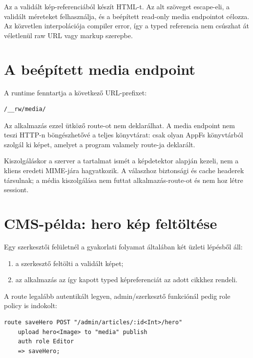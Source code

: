 Az  a validált kép-referenciából készít HTML-t. Az alt szöveget escape-eli, a validált méreteket felhasználja, és a beépített read-only media endpointot célozza. Az  közvetlen  interpolációja compiler error, így a typed referencia nem csúszhat át véletlenül raw URL vagy markup szerepbe.

\section{A beépített media endpoint}

A runtime fenntartja a következő URL-prefixet:

\begin{lstlisting}
/__rw/media/
\end{lstlisting}

Az alkalmazás ezzel ütköző route-ot nem deklarálhat. A media endpoint nem teszi HTTP-n böngészhetővé a teljes  könyvtárat: csak olyan AppFs könyvtárból szolgál ki képet, amelyet a program valamely  route-ja deklarált.

Kiszolgáláskor a szerver a tartalmat ismét a képdetektor alapján kezeli, nem a kliens eredeti MIME-jára hagyatkozik. A válaszhoz biztonsági és cache headerek társulnak; a média kiszolgálása nem futtat alkalmazás-route-ot és nem hoz létre sessiont.

\section{CMS-példa: hero kép feltöltése}

Egy szerkesztői felületnél a gyakorlati folyamat általában két üzleti lépésből áll:

\begin{enumerate}
  \item a szerkesztő feltölti a validált képet;
  \item az alkalmazás az így kapott typed képreferenciát az adott cikkhez rendeli.
\end{enumerate}

A route legalább autentikált legyen, admin/szerkesztő funkciónál pedig role policy is indokolt:

\begin{lstlisting}[language=RWLang]
route saveHero POST "/admin/articles/:id<Int>/hero"
    upload hero<Image> to "media" publish
    auth role Editor
    => saveHero;
\end{lstlisting}

